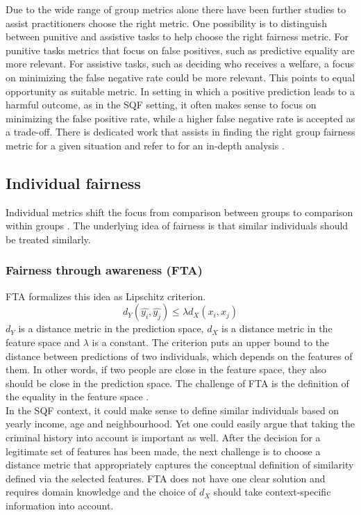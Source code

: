 Due to the wide range of group metrics alone there have been further studies to assist practitioners choose the right metric. One possibility is to distinguish between punitive and assistive tasks to help choose the right fairness metric. For punitive tasks metrics that focus on false positives, such as predictive equality are more relevant. For assistive tasks, such as deciding who receives a welfare, a focus on minimizing the false negative rate could be more relevant. This points to equal opportunity as suitable metric.
In setting in which a positive prediction leads to a harmful outcome, as in the SQF setting, it often makes sense to focus on minimizing the false positive rate, while a higher false negative rate is accepted as a trade-off.
There is dedicated work that assists in finding the right group fairness metric for a given situation and refer to for an in-depth analysis \cite{makhlouf2021}.


\subsection{Individual fairness}
Individual metrics shift the focus from comparison between groups to comparison within groups . The underlying idea of fairness is that similar individuals should be treated similarly.

\subsubsection*{Fairness through awareness (FTA)}
FTA formalizes this idea as Lipschitz criterion. $$d_Y(\hat{y_i}, \hat{y_j}) \leq \lambda {d_X}(x_i, x_j)$$
$d_Y$ is a distance metric in the prediction space, $d_X$ is a distance metric in the feature space and $\lambda$ is a constant.
The criterion puts an upper bound to the distance between predictions of two individuals, which depends on the features of them. In other words, if two people are close in the feature space, they also should be close in the prediction space. The challenge of FTA is the definition of the equality in the feature space \cite{castelnovo2022}.\\
In the SQF context, it could make sense to define similar individuals based on yearly income, age and neighbourhood.
Yet one could easily argue that taking the criminal history into account is important as well. After the decision for a legitimate set of features has been made, the next challenge is to choose a distance metric that appropriately captures the conceptual definition of similarity defined via the selected features.
FTA does not have one clear solution and requires domain knowledge and the choice of $d_X$ should take context-specific information into account.

